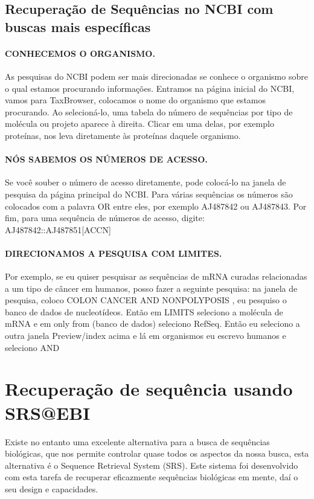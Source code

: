 \documentclass[letter,11pt]{book}
\begin{document}
\subsection{Recuperação de Sequências no NCBI com buscas mais específicas}

\paragraph{CONHECEMOS O ORGANISMO.} As pesquisas do NCBI podem ser mais direcionadas se conhece o organismo sobre o qual estamos procurando informações. Entramos na página inicial do NCBI, vamos para TaxBrowser, colocamos o nome do organismo que estamos procurando. Ao selecioná-lo, uma tabela do número de sequências por tipo de molécula ou projeto aparece à direita. Clicar em uma delas, por exemplo proteínas, nos leva diretamente às proteínas daquele organismo. 

\paragraph{NÓS SABEMOS OS NÚMEROS DE ACESSO.} Se você souber o número de acesso diretamente, pode colocá-lo na janela de pesquisa da página principal do NCBI. Para várias sequências os números são colocados com a palavra OR entre eles, por exemplo AJ487842 ou AJ487843. Por fim, para uma sequência de números de acesso, digite: AJ487842::AJ487851[ACCN] 

\paragraph{DIRECIONAMOS A PESQUISA COM LIMITES.} Por exemplo, se eu quiser pesquisar as sequências de mRNA curadas relacionadas a um tipo de câncer em humanos, posso fazer a seguinte pesquisa: na janela de pesquisa, coloco COLON CANCER AND NONPOLYPOSIS , eu pesquiso o banco de dados de nucleotídeos. Então em LIMITS seleciono a molécula de mRNA e em only from (banco de dados) seleciono RefSeq. Então eu seleciono a outra janela Preview/index acima e lá em organismos eu escrevo humanos e seleciono AND 

\section{Recuperação de sequência usando SRS@EBI\label{srs}}

Existe no entanto uma excelente alternativa para a busca de sequências biológicas, que nos permite controlar quase todos os aspectos da nossa busca, esta alternativa é o Sequence Retrieval System (SRS). Este sistema foi desenvolvido com esta tarefa de recuperar eficazmente sequências biológicas em mente, daí o seu design e capacidades. 
\end{document}
